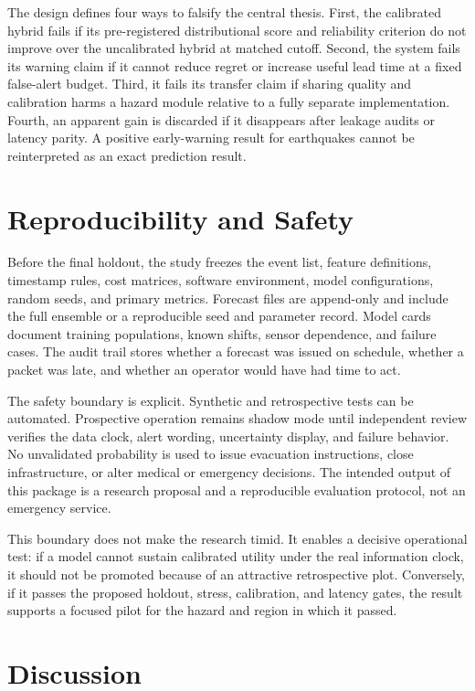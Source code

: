 \documentclass[conference]{IEEEtran}
\begin{document}
The design defines four ways to falsify the central thesis. First, the calibrated hybrid fails if its pre-registered distributional score and reliability criterion do not improve over the uncalibrated hybrid at matched cutoff. Second, the system fails its warning claim if it cannot reduce regret or increase useful lead time at a fixed false-alert budget. Third, it fails its transfer claim if sharing quality and calibration harms a hazard module relative to a fully separate implementation. Fourth, an apparent gain is discarded if it disappears after leakage audits or latency parity. A positive early-warning result for earthquakes cannot be reinterpreted as an exact prediction result.

\section{Reproducibility and Safety}

Before the final holdout, the study freezes the event list, feature definitions, timestamp rules, cost matrices, software environment, model configurations, random seeds, and primary metrics. Forecast files are append-only and include the full ensemble or a reproducible seed and parameter record. Model cards document training populations, known shifts, sensor dependence, and failure cases. The audit trail stores whether a forecast was issued on schedule, whether a packet was late, and whether an operator would have had time to act.

The safety boundary is explicit. Synthetic and retrospective tests can be automated. Prospective operation remains shadow mode until independent review verifies the data clock, alert wording, uncertainty display, and failure behavior. No unvalidated probability is used to issue evacuation instructions, close infrastructure, or alter medical or emergency decisions. The intended output of this package is a research proposal and a reproducible evaluation protocol, not an emergency service.

This boundary does not make the research timid. It enables a decisive operational test: if a model cannot sustain calibrated utility under the real information clock, it should not be promoted because of an attractive retrospective plot. Conversely, if it passes the proposed holdout, stress, calibration, and latency gates, the result supports a focused pilot for the hazard and region in which it passed.

\section{Discussion}
\end{document}
